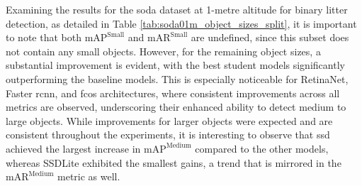 Examining the results for the \gls{soda} dataset at 1-metre altitude for binary litter detection, as detailed in Table \ref{tab:soda01m_object_sizes_split}, it is important to note that both $\text{mAP}^{\text{Small}}$ and $\text{mAR}^{\text{Small}}$ are undefined, since this subset does not contain any small objects. However, for the remaining object sizes, a substantial improvement is evident, with the best student models significantly outperforming the baseline models. This is especially noticeable for RetinaNet, Faster \gls{rcnn}, and \gls{fcos} architectures, where consistent improvements across all metrics are observed, underscoring their enhanced ability to detect medium to large objects. While improvements for larger objects were expected and are consistent throughout the experiments, it is interesting to observe that \gls{ssd} achieved the largest increase in $\text{mAP}^{\text{Medium}}$ compared to the other models, whereas SSDLite exhibited the smallest gains, a trend that is mirrored in the $\text{mAR}^{\text{Medium}}$ metric as well.

